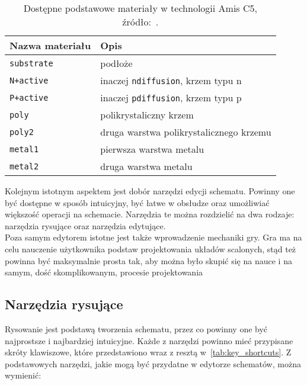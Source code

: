 \newpage
\begin{table}[h]
    \centering
    \caption[Dostępne materiały w technologii Amis C5.]
    {Dostępne podstawowe materiały w technologii Amis C5, źródło:~\cite{amis_params}.}
    \label{tab:amis_materials}
    \begin{tabular}{|l|l|}
        \hline
        Nazwa materiału & Opis \\
        \hline
        \hline
        \texttt{substrate} & podłoże \\
        \hline
        \texttt{N+active} & inaczej \texttt{ndiffusion}, krzem typu n\\
        \hline
        \texttt{P+active} & inaczej \texttt{pdiffusion}, krzem typu p\\
        \hline
        \texttt{poly} & polikrystaliczny krzem \\
        \hline
        \texttt{poly2} & druga warstwa polikrystalicznego krzemu \\
        \hline
        \texttt{metal1} & pierwsza warstwa metalu \\
        \hline
        \texttt{metal2} & druga warstwa metalu \\
        \hline
    \end{tabular}
\end{table}

\indent Kolejnym istotnym aspektem jest dobór narzędzi edycji schematu.
Powinny one być dostępne w sposób intuicyjny, być łatwe w obsłudze oraz umożliwiać większość operacji na schemacie.
Narzędzia te można rozdzielić na dwa rodzaje: narzędzia rysujące oraz narzędzia edytujące. \\
\indent Poza samym edytorem istotne jest także wprowadzenie mechaniki gry.
Gra ma na celu nauczenie użytkownika podstaw projektowania układów scalonych,
stąd też powinna być maksymalnie prosta tak, aby można było skupić się na nauce i na samym,
dość skomplikowanym, procesie projektowania

\subsection{Narzędzia rysujące}
\label{subsec:narzedzia_rysujace}

Rysowanie jest podstawą tworzenia schematu, przez co powinny one być najprostsze i najbardziej intuicyjne.
Każde z narzędzi powinno mieć przypisane skróty klawiszowe,
które przedstawiono wraz z resztą w~\ref{tab:key_shortcuts}. %
Z podstawowych narzędzi, jakie mogą być przydatne w edytorze schematów, można wymienić:

